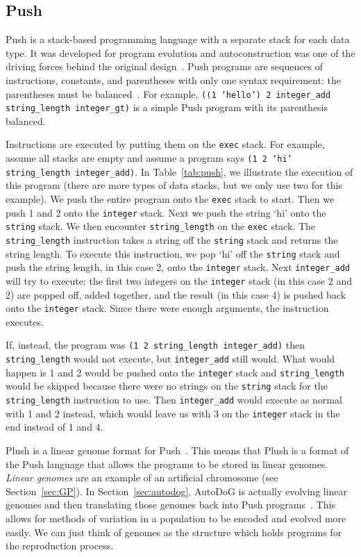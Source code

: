\documentclass{sig-alternate}
\begin{document}
\subsection{Push}
\label{sec:push}
Push is a stack-based programming language with a separate stack for each data type. It was developed for program evolution and autoconstruction was one of the driving forces behind the original design~\cite{spector:2016}. Push programs are sequences of instructions, constants, and parentheses with only one syntax requirement: the parentheses must be balanced~\cite{lee:2001}. For example, \texttt{((1 `hello') 2 integer\_add string\_length integer\_gt)} is a simple Push program with its parenthesis balanced.

Instructions are executed by putting them on the \texttt{exec} stack. For example, assume all stacks are empty and assume a program says \texttt{(1 2 `hi' string\_length integer\_add)}. In Table~\ref{tab:push}, we illustrate the execution of this program (there are more types of data stacks, but we only use two for this example). We push the entire program onto the \texttt{exec} stack to start. Then we push 1 and 2 onto the \texttt{integer} stack. Next we push the string `hi' onto the \texttt{string} stack. We then encounter \texttt{string\_length} on the \texttt{exec} stack. The \texttt{string\_length} instruction takes a string off the \texttt{string} stack and returns the string length. To execute this instruction, we pop `hi' off the \texttt{string} stack and push the string length, in this case 2, onto the \texttt{integer} stack. Next \texttt{integer\_add} will try to execute: the first two integers on the \texttt{integer} stack (in this case 2 and 2) are popped off, added together, and the result (in this case 4) is pushed back onto the \texttt{integer} stack. Since there were enough arguments, the instruction executes.~\cite{lee:tutorial}

If, instead, the program was \texttt{(1 2 string\_length integer\_add)} then \texttt{string\_length} would not execute, but \texttt{integer\_add} still would. What would happen is 1 and 2 would be pushed onto the \texttt{integer} stack and \texttt{string\_length} would be skipped because there were no strings on the \texttt{string} stack for the \texttt{string\_length} instruction to use. Then \texttt{integer\_add} would execute as normal with 1 and 2 instead, which would leave us with 3 on the \texttt{integer} stack in the end instead of 1 and 4.

Plush is a linear genome format for Push~\cite{spector:2016}. This means that Plush is a format of the Push language that allows the programs to be stored in linear genomes. \textit{Linear genomes} are an example of an artificial chromosome (see Section~\ref{sec:GP}). In Section~\ref{sec:autodog}, AutoDoG is actually evolving linear genomes and then translating those genomes back into Push programs~\cite{spector:2016}. This allows for methods of variation in a population to be encoded and evolved more easily. We can just think of genomes as the structure which holds programs for the reproduction process.
\end{document}
